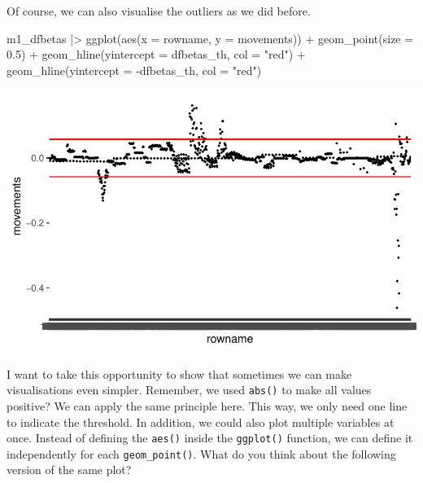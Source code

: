 \documentclass[
  letterpaper,
  DIV=11,
  numbers=noendperiod]{scrreprt}
\newenvironment{Shaded}{\begin{snugshade}}{\end{snugshade}}
\newcommand{\AttributeTok}[1]{\textcolor[rgb]{0.40,0.45,0.13}{#1}}
\newcommand{\FloatTok}[1]{\textcolor[rgb]{0.68,0.00,0.00}{#1}}
\newcommand{\FunctionTok}[1]{\textcolor[rgb]{0.28,0.35,0.67}{#1}}
\newcommand{\NormalTok}[1]{\textcolor[rgb]{0.00,0.23,0.31}{#1}}
\newcommand{\SpecialCharTok}[1]{\textcolor[rgb]{0.37,0.37,0.37}{#1}}
\newcommand{\StringTok}[1]{\textcolor[rgb]{0.13,0.47,0.30}{#1}}
\begin{document}
Of course, we can also visualise the outliers as we did before.

\begin{Shaded}
\begin{Highlighting}[]
\NormalTok{m1\_dfbetas }\SpecialCharTok{|\textgreater{}}
  \FunctionTok{ggplot}\NormalTok{(}\FunctionTok{aes}\NormalTok{(}\AttributeTok{x =}\NormalTok{ rowname,}
             \AttributeTok{y =}\NormalTok{ movements)) }\SpecialCharTok{+}
  \FunctionTok{geom\_point}\NormalTok{(}\AttributeTok{size =} \FloatTok{0.5}\NormalTok{) }\SpecialCharTok{+}
  \FunctionTok{geom\_hline}\NormalTok{(}\AttributeTok{yintercept =}\NormalTok{ dfbetas\_th, }\AttributeTok{col =} \StringTok{"red"}\NormalTok{) }\SpecialCharTok{+}
  \FunctionTok{geom\_hline}\NormalTok{(}\AttributeTok{yintercept =} \SpecialCharTok{{-}}\NormalTok{dfbetas\_th, }\AttributeTok{col =} \StringTok{"red"}\NormalTok{)}
\end{Highlighting}
\end{Shaded}

\includegraphics{13_regressions_files/figure-latex/dfbetas-plot-outliers-1.pdf}

I want to take this opportunity to show that sometimes we can make
visualisations even simpler. Remember, we used \texttt{abs()} to make
all values positive? We can apply the same principle here. This way, we
only need one line to indicate the threshold. In addition, we could also
plot multiple variables at once. Instead of defining the \texttt{aes()}
inside the \texttt{ggplot()} function, we can define it independently
for each \texttt{geom\_point()}. What do you think about the following
version of the same plot?
\end{document}
